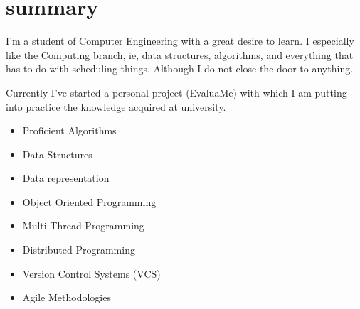 \documentclass[]{friggeri-cv} %
\begin{document}
\begin{aside}
\begin{comment}
 \section{personality}
Java\quad{\color{blue} $\varheartsuit\varheartsuit\varheartsuit\varheartsuit$}{\color{black} $\varheartsuit\varheartsuit$} 
Python\quad{\color{blue} $\varheartsuit\varheartsuit\varheartsuit\varheartsuit$}{\color{black} $\varheartsuit\varheartsuit$} 
JavaScript\quad{\color{blue} $\varheartsuit\varheartsuit\varheartsuit\varheartsuit$}{\color{black} $\varheartsuit\varheartsuit$} 
 C\quad{\color{blue} $\varheartsuit\varheartsuit\varheartsuit\varheartsuit$}{\color{black} $\varheartsuit\varheartsuit$} 
 C++\quad{\color{blue} $\varheartsuit\varheartsuit\varheartsuit\varheartsuit$}{\color{black} $\varheartsuit\varheartsuit$} 
 \end{comment}
\end{aside}




\section{summary}



I'm a student of Computer Engineering with a great desire to learn. I especially like the Computing branch, ie, data structures, algorithms, and everything that has to do with scheduling things. Although I do not close the door to anything. 

Currently I've started a personal project (EvaluaMe) with which I am putting into practice the knowledge acquired at university.

\noindent\begin{minipage}[t]{0.5\linewidth}
    \begin{itemize}
    	\item{Proficient Algorithms}
	\item{Data Structures}
    	\item{Data representation}
    	\item{Object Oriented Programming}

    \end{itemize}
    \end{minipage}%
    \begin{minipage}[t]{0.5\linewidth}
    \begin{itemize}
    	\item{Multi-Thread Programming}
    	\item{Distributed Programming}
   	\item{Version Control Systems (VCS)}
   	\item{Agile Methodologies}
    \end{itemize}
\end{minipage}\par\bigskip
\end{document}
